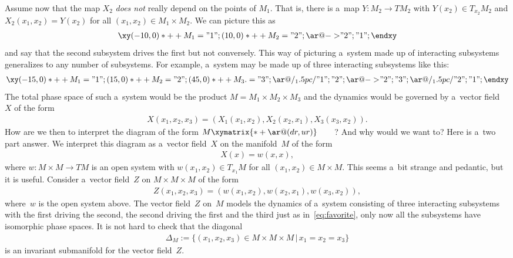 \documentclass[10pt,a4paper]{amsart}
\numberwithin{equation}{section}
\begin{document}
Assume now that the map $X_2$ {\em does not} really depend on the points of $M_1$.
That is, there is a~map $Y:M_2 \to TM_2$ with $Y(x_2) \in T_{x_2}M_2$ and $X_2(x_1,x_2) = Y(x_2)$ for all $(x_1,x_2)\in
M_1\times M_2$.
We can picture this as
\begin{gather*}
\xy
(-10,0)*++{M_1}="1";
(10,0)*++{M_2}="2";
{\ar@{->} "2";"1"};
\endxy
\end{gather*}
and say that the second subsystem drives the f\/irst but not conversely.
This way of picturing a~system made up of interacting subsystems generalizes to any number of subsystems.
For example, a~system may be made up of three interacting subsystems like this:
\begin{gather}
\label{eq:favorite}
\xy
(-15,0)*++{M_1}="1";
(15,0)*++{M_2}="2";
(45,0)*++{M_3.}="3";
{\ar@/_1.5pc/ "1";"2"};
{\ar@{->}_{} "2";"3"};
{\ar@/_1.5pc/ "2";"1"};
\endxy
\end{gather}
The total phase space of such a~system would be the product $M=M_1\times M_2 \times M_3$ and the dynamics would be
governed by a~vector f\/ield~$X$ of the form
\begin{gather*}
X(x_1,x_2, x_3) = (X_1(x_1, x_2), X_2 (x_2, x_1), X_3(x_3, x_2)).
\end{gather*}
How are we then to interpret the diagram of the form $ M \xymatrix{*+{ } \ar@(dr,ur)}$~~~~?
And why would we want to? Here is a~two part answer.
We interpret this diagram as a~vector f\/ield~$X$ on the manifold~$M$ of the form
\begin{gather*}
X(x) = w(x,x),
\end{gather*}
where $w:M\times M\to TM$ is an open system with $w(x_1,x_2) \in T_{x_1} M$ for all $(x_1,x_2) \in M\times M$.
This seems a~bit strange and pedantic, but it is useful.
Consider a~vector f\/ield~$Z$ on $M\times M\times M$ of the form
\begin{gather*}
Z(x_1,x_2, x_3) = (w(x_1, x_2), w(x_2,x_1), w(x_3,x_2)),
\end{gather*}
where~$w$ is the open system above.
The vector f\/ield~$Z$ on~$M$ models the dynamics of a~system consisting of three interacting subsystems with the f\/irst
driving the second, the second driving the f\/irst and the third just as in~\eqref{eq:favorite}, only now all the
subsystems have isomorphic phase spaces.
It is not hard to check that the diagonal
\begin{gather*}
\Delta_M:= \{(x_1,x_2,x_3)\in M\times M\times M \,|\, x_1 = x_2 = x_3\}
\end{gather*}
is an invariant submanifold for the vector f\/ield~$Z$.
\end{document}
